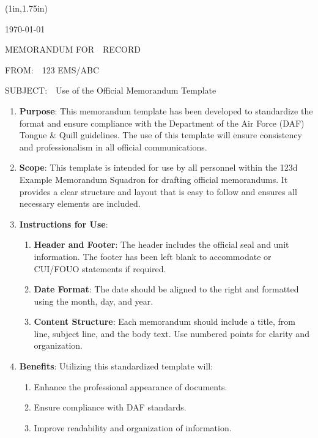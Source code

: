 \documentclass[12pt]{article}
\newenvironment{memoblock}{
    \begin{textblock*}{\textwidth}(1in,1.75in)
    \noindent
}{
    \end{textblock*}
}
\newenvironment{memolist}[1][]{
    \begin{enumerate}[labelsep=0.4em,leftmargin=0pt,itemindent=14pt,#1]
}{
    \end{enumerate}
}
\newenvironment{submemolist}{
    \begin{enumerate}[labelsep=0.2em,leftmargin=1.2em,itemindent=14pt,label=\alph*.~ ]
}{
    \end{enumerate}
}
\begin{document}
\thispagestyle{firstpage}

\begin{memoblock}

\hfill\monthyeardate\today

\noindent MEMORANDUM FOR~~RECORD

\noindent FROM:~~123 EMS/ABC

\noindent SUBJECT:~~Use of the Official Memorandum Template

\begin{memolist}
    \item \textbf{Purpose}: This memorandum template has been developed to standardize the format and ensure compliance with the Department of the Air Force (DAF) Tongue \& Quill guidelines. The use of this template will ensure consistency and professionalism in all official communications.
    
    \item \textbf{Scope}: This template is intended for use by all personnel within the 123d Example Memorandum Squadron for drafting official memorandums. It provides a clear structure and layout that is easy to follow and ensures all necessary elements are included.
    
    \item \textbf{Instructions for Use}:
        \begin{submemolist}
            \item \textbf{Header and Footer}: The header includes the official seal and unit information. The footer has been left blank to accommodate or CUI/FOUO statements if required.
            \item \textbf{Date Format}: The date should be aligned to the right and formatted using the month, day, and year.
            \item \textbf{Content Structure}: Each memorandum should include a title, from line, subject line, and the body text. Use numbered points for clarity and organization.
        \end{submemolist}
    
    \item \textbf{Benefits}: Utilizing this standardized template will:
        \begin{submemolist}
            \item Enhance the professional appearance of documents.
            \item Ensure compliance with DAF standards.
            \item Improve readability and organization of information.
        \end{submemolist}
    

\end{memolist}
\end{memoblock}
\end{document}

